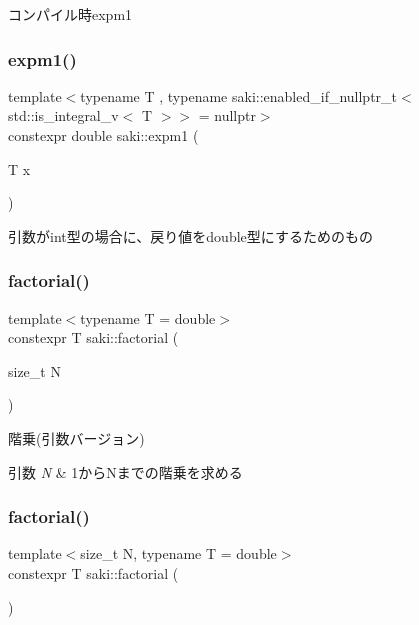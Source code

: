 コンパイル時expm1 

\mbox{\label{namespacesaki_ae4490f448ed3d82712306c54d6821788}} 
\subsubsection{\texorpdfstring{expm1()}{expm1()}\hspace{0.1cm}{\footnotesize\ttfamily [2/2]}}
{\footnotesize\ttfamily template$<$typename T , typename saki\+::enabled\+\_\+if\+\_\+nullptr\+\_\+t$<$ std\+::is\+\_\+integral\+\_\+v$<$ T $>$$>$  = nullptr$>$ \\
constexpr double saki\+::expm1 (\begin{DoxyParamCaption}\item[{T}]{x }\end{DoxyParamCaption})}



引数がint型の場合に、戻り値をdouble型にするためのもの 

\mbox{\label{namespacesaki_a224c4843b72acf995e13809a5caaafd8}} 
\subsubsection{\texorpdfstring{factorial()}{factorial()}\hspace{0.1cm}{\footnotesize\ttfamily [1/2]}}
{\footnotesize\ttfamily template$<$typename T  = double$>$ \\
constexpr T saki\+::factorial (\begin{DoxyParamCaption}\item[{size\+\_\+t}]{N }\end{DoxyParamCaption})}



階乗(引数バージョン) 


\begin{DoxyParams}{引数}
{\em N} & 1から\+Nまでの階乗を求める \\
\hline
\end{DoxyParams}
\mbox{\label{namespacesaki_a9dead910b791cee99cf82d1bd2a5d90c}} 
\subsubsection{\texorpdfstring{factorial()}{factorial()}\hspace{0.1cm}{\footnotesize\ttfamily [2/2]}}
{\footnotesize\ttfamily template$<$size\+\_\+t N, typename T  = double$>$ \\
constexpr T saki\+::factorial (\begin{DoxyParamCaption}{ }\end{DoxyParamCaption})}



